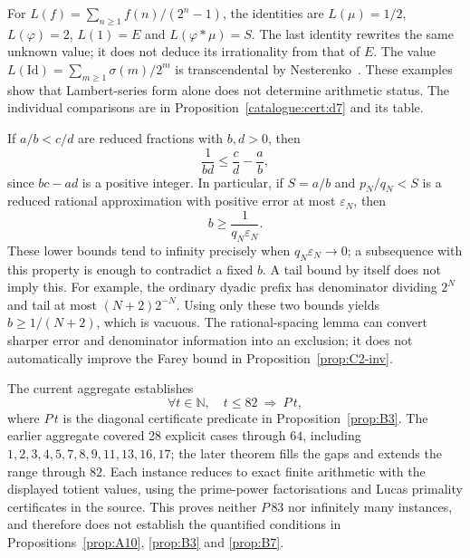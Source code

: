 \begin{prop}\label{prop:D7-inv}
For $L(f)=\sum_{n\ge1}f(n)/(2^n-1)$, the identities are
$L(\mu)=1/2$, $L(\varphi)=2$, $L(1)=E$ and $L(\varphi*\mu)=S$.
The last identity rewrites the same unknown value; it does not deduce its
irrationality from that of $E$. The value
$L(\mathrm{Id})=\sum_{m\ge1}\sigma(m)/2^m$ is transcendental by
Nesterenko~\cite[Cor.~2, p.~1320]{nesterenko1996}.
These examples show that Lambert-series form alone does not determine
arithmetic status. The individual comparisons are in
Proposition~\ref{catalogue:cert:d7} and its table.
\end{prop}

\begin{prop}\label{prop:D9-inv}
If $a/b<c/d$ are reduced fractions with $b,d>0$, then
\[
 \frac{1}{bd}\le\frac cd-\frac ab,
\]
since $bc-ad$ is a positive integer. In particular, if $S=a/b$ and
$p_N/q_N<S$ is a reduced rational approximation with positive error
at most $\varepsilon_N$, then
\[
 b\ge\frac{1}{q_N\varepsilon_N}.
\]
These lower bounds tend to infinity precisely when
$q_N\varepsilon_N\to0$; a subsequence with this property is enough
to contradict a fixed $b$. A tail bound by itself does not imply this. For example, the ordinary dyadic
prefix has denominator dividing $2^N$ and tail at most
$(N+2)2^{-N}$. Using only these two bounds yields
$b\ge1/(N+2)$, which is vacuous. The rational-spacing lemma can
convert sharper error and denominator information into an exclusion;
it does not automatically improve the Farey bound in
Proposition~\ref{prop:C2-inv}.
\end{prop}

\begin{prop}\label{prop:B11-inv}
The current aggregate establishes
\[
 \forall t\in\mathbb N,\quad t\le82\ \Longrightarrow\ P\,t,
\]
where $P\,t$ is the diagonal certificate predicate in
Proposition~\ref{prop:B3}. The earlier aggregate covered 28 explicit
cases through $64$, including
$1,2,3,4,5,7,8,9,11,13,16,17$; the later theorem fills the gaps
and extends the range through $82$. Each instance reduces to exact
finite arithmetic with the displayed totient values, using the
prime-power factorisations and Lucas primality certificates in the
source. This proves neither $P\,83$ nor infinitely many instances,
and therefore does not establish the quantified conditions in
Propositions~\ref{prop:A10}, \ref{prop:B3} and \ref{prop:B7}.
\end{prop}

